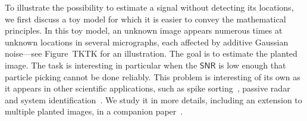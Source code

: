 \documentclass[english,11pt]{article}
\newcommand{\1}{\mathbf{1}}
\newcommand{\TODO}[1]{{\color{red}{[#1]}}}
\numberwithin{equation}{section}
\theoremstyle{plain}
\theoremstyle{definition}
\theoremstyle{remark}
\theoremstyle{plain}
\theoremstyle{remark}
\theoremstyle{plain}
\theoremstyle{plain}
\newcommand{\SNR}{\ensuremath{\textsf{SNR}}}
\begin{document}
To illustrate the possibility to estimate a signal without detecting its locations, we first discuss a toy model for which it is easier to convey the mathematical principles. 
In this toy model, an unknown image appears numerous times at unknown locations in several micrographs, each affected by additive Gaussian noise---see Figure~TKTK for an illustration.
The goal is to estimate the planted image. The task is interesting in particular when the $\SNR$ is low enough that particle picking cannot be done reliably. 
This problem is interesting of its own as it appears in other scientific applications, such as spike sorting~\cite{lewicki1998review}, passive radar~\cite{gogineni2017passive} and system identification~\cite{ljung1998system}. We study it in more details, including an extension to multiple planted images, in a companion paper~\cite{bendory2018estimation}.

%










\end{document}
